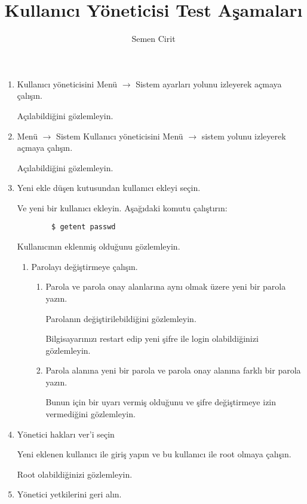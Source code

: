 \documentclass[a4paper,10pt]{article}
\title{Kullanıcı Yöneticisi Test Aşamaları}
\author{Semen Cirit}
\begin{document}
\maketitle

\begin{enumerate}

\item Kullanıcı yöneticisini Menü $\rightarrow$ Sistem ayarları yolunu izleyerek açmaya çalışın.
	
Açılabildiğini gözlemleyin.

\item Menü $\rightarrow$ Sistem Kullanıcı yöneticisini Menü $\rightarrow$ sistem yolunu izleyerek açmaya çalışın.

Açılabildiğini gözlemleyin.

\item Yeni ekle düşen kutusundan kullanıcı ekleyi seçin.

   Ve yeni bir kullanıcı ekleyin.
    Aşağıdaki komutu çalıştırın:
    \begin{verbatim}
        $ getent passwd 
    \end{verbatim}
    Kullanıcının eklenmiş olduğunu gözlemleyin.

    \begin{enumerate}
    \item Parolayı değiştirmeye çalışın.
        \begin{enumerate}
        \item Parola ve parola onay alanlarına aynı olmak üzere yeni bir parola yazın.
	
	Parolanın değiştirilebildiğini gözlemleyin.

	Bilgisayarınızı restart edip yeni şifre ile login olabildiğinizi gözlemleyin. 
        \item Parola alanına yeni bir parola ve parola onay alanına farklı bir parola yazın. 

	Bunun için bir uyarı vermiş olduğunu ve şifre değiştirmeye izin vermediğini gözlemleyin.
	
        \end{enumerate}
    \end{enumerate}


    \item Yönetici hakları ver'i seçin

          Yeni eklenen kullanıcı ile giriş yapın ve bu kullanıcı ile root olmaya çalışın. 

	  Root olabildiğinizi gözlemleyin.
    \item Yönetici yetkilerini geri alın.


\end{enumerate}
\end{document}
